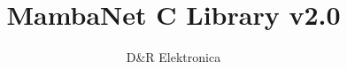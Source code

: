 \documentclass[a4paper]{report}
\begin{document}
\title{MambaNet C Library v2.0}
\author{D\&R Elektronica}
\maketitle

\setcounter{tocdepth}{1}
\tableofcontents
\setcounter{tocdepth}{2}




\end{document}
